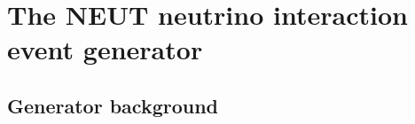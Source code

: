 \chapter{The NEUT neutrino interaction event generator}
\label{chap:NEUT}

\section{Generator background}
\label{sec:NEUT:background}

